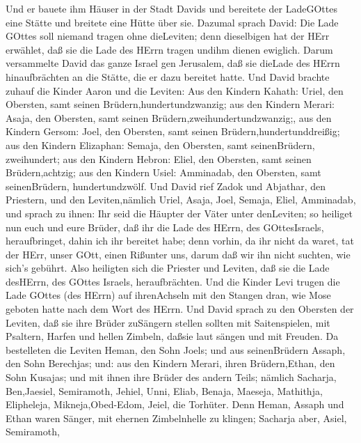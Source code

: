  Und er bauete ihm Häuser in der Stadt Davids und bereitete
der LadeGOttes eine Stätte und breitete eine Hütte über sie.
 Dazumal sprach David: Die Lade GOttes soll niemand tragen
ohne dieLeviten; denn dieselbigen hat der HErr erwählet, daß sie die
Lade des HErrn tragen undihm dienen ewiglich.  Darum
versammelte David das ganze Israel gen Jerusalem, daß sie dieLade des
HErrn hinaufbrächten an die Stätte, die er dazu bereitet hatte.
 Und David brachte zuhauf die Kinder Aaron und die Leviten:
 Aus den Kindern Kahath: Uriel, den Obersten, samt seinen
Brüdern,hundertundzwanzig;  aus den Kindern Merari: Asaja,
den Obersten, samt seinen Brüdern,zweihundertundzwanzig;, 
aus den Kindern Gersom: Joel, den Obersten, samt seinen
Brüdern,hundertunddreißig;  aus den Kindern Elizaphan:
Semaja, den Obersten, samt seinenBrüdern, zweihundert;  aus
den Kindern Hebron: Eliel, den Obersten, samt seinen Brüdern,achtzig;
 aus den Kindern Usiel: Amminadab, den Obersten, samt
seinenBrüdern, hundertundzwölf.  Und David rief Zadok und
Abjathar, den Priestern, und den Leviten,nämlich Uriel, Asaja, Joel,
Semaja, Eliel, Amminadab,  und sprach zu ihnen: Ihr seid
die Häupter der Väter unter denLeviten; so heiliget nun euch und eure
Brüder, daß ihr die Lade des HErrn, des GOttesIsraels, heraufbringet,
dahin ich ihr bereitet habe;  denn vorhin, da ihr nicht da
waret, tat der HErr, unser GOtt, einen Rißunter uns, darum daß wir ihn
nicht suchten, wie sich's gebührt.  Also heiligten sich die
Priester und Leviten, daß sie die Lade desHErrn, des GOttes Israels,
heraufbrächten.  Und die Kinder Levi trugen die Lade GOttes
(des HErrn) auf ihrenAchseln mit den Stangen dran, wie Mose geboten
hatte nach dem Wort des HErrn.  Und David sprach zu den
Obersten der Leviten, daß sie ihre Brüder zuSängern stellen sollten mit
Saitenspielen, mit Psaltern, Harfen und hellen Zimbeln, daßsie laut
sängen und mit Freuden.  Da bestelleten die Leviten Heman,
den Sohn Joels; und aus seinenBrüdern Assaph, den Sohn Berechjas; und:
aus den Kindern Merari, ihren Brüdern,Ethan, den Sohn Kusajas;
 und mit ihnen ihre Brüder des andern Teils; nämlich
Sacharja, Ben,Jaesiel, Semiramoth, Jehiel, Unni, Eliab, Benaja, Maeseja,
Mathithja, Elipheleja, Mikneja,Obed-Edom, Jeiel, die Torhüter.
 Denn Heman, Assaph und Ethan waren Sänger, mit ehernen
Zimbelnhelle zu klingen;  Sacharja aber, Asiel, Semiramoth,
